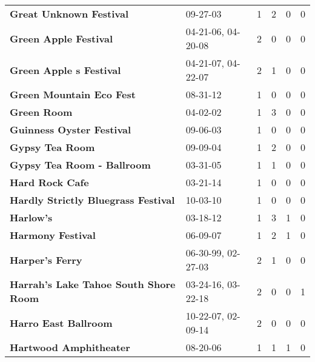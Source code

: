 \begin{supertabular}{llllll}
                                      \textbf{Great Unknown Festival} &                      09-27-03 &  1 &   2 &  0 &  0 \\
                                        \textbf{Green Apple Festival} &            04-21-06, 04-20-08 &  2 &   0 &  0 &  0 \\
                                      \textbf{Green Apple s Festival} &            04-21-07, 04-22-07 &  2 &   1 &  0 &  0 \\
                                     \textbf{Green Mountain Eco Fest} &                      08-31-12 &  1 &   0 &  0 &  0 \\
                                                  \textbf{Green Room} &                      04-02-02 &  1 &   3 &  0 &  0 \\
                                    \textbf{Guinness Oyster Festival} &                      09-06-03 &  1 &   0 &  0 &  0 \\
                                              \textbf{Gypsy Tea Room} &                      09-09-04 &  1 &   2 &  0 &  0 \\
                                   \textbf{Gypsy Tea Room - Ballroom} &                      03-31-05 &  1 &   1 &  0 &  0 \\
                                              \textbf{Hard Rock Cafe} &                      03-21-14 &  1 &   0 &  0 &  0 \\
                          \textbf{Hardly Strictly Bluegrass Festival} &                      10-03-10 &  1 &   0 &  0 &  0 \\
                                                    \textbf{Harlow's} &                      03-18-12 &  1 &   3 &  1 &  0 \\
                                            \textbf{Harmony Festival} &                      06-09-07 &  1 &   2 &  1 &  0 \\
                                              \textbf{Harper's Ferry} &            06-30-99, 02-27-03 &  2 &   1 &  0 &  0 \\
                        \textbf{Harrah’s Lake Tahoe South Shore Room} &            03-24-16, 03-22-18 &  2 &   0 &  0 &  1 \\
                                         \textbf{Harro East Ballroom} &            10-22-07, 02-09-14 &  2 &   0 &  0 &  0 \\
                                       \textbf{Hartwood Amphitheater} &                      08-20-06 &  1 &   1 &  1 &  0 \\

\end{supertabular}
